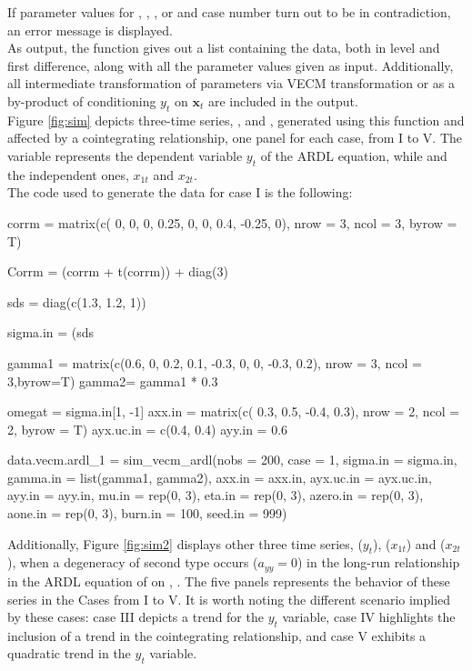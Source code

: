If parameter values for , , , or  and case number turn out to be in contradiction, an error message is displayed.\\
As output, the function gives out a list containing the data, both in level and first difference, along with all the parameter values given as input. Additionally, all intermediate transformation of parameters via VECM transformation or as a by-product of conditioning $y_{t}$ on $\mathbf{x}_{t}$ are included in the output.\\
Figure \ref{fig:sim} depicts  three-time series, ,  and , generated using this function and affected by a cointegrating relationship, one panel for each case, from I to V. The variable  represents the dependent variable $y_t$ of the ARDL equation, while  and  the independent ones, $x_{1t}$ and $x_{2t}$. \\
The code used to generate the data for case I is the following:
\begin{example}
    corrm = matrix(c(   0,     0, 0,
                     0.25,     0, 0,
                      0.4, -0.25, 0), nrow = 3, ncol = 3, byrow = T)

    Corrm = (corrm + t(corrm)) + diag(3)

    sds = diag(c(1.3, 1.2, 1))

    sigma.in = (sds %

    gamma1 = matrix(c(0.6,    0, 0.2,
                      0.1, -0.3,   0,
                        0, -0.3, 0.2), nrow = 3, ncol = 3,byrow=T)
    gamma2= gamma1 * 0.3

    omegat = sigma.in[1, -1] %
    axx.in = matrix(c( 0.3, 0.5,
                      -0.4, 0.3), nrow = 2, ncol = 2, byrow = T)
    ayx.uc.in = c(0.4, 0.4)
    ayy.in = 0.6

    data.vecm.ardl_1 =
    sim_vecm_ardl(nobs = 200,
                  case = 1,
                  sigma.in = sigma.in,
                  gamma.in = list(gamma1, gamma2),
                  axx.in = axx.in,
                  ayx.uc.in = ayx.uc.in,
                  ayy.in = ayy.in,
                  mu.in = rep(0, 3),
                  eta.in = rep(0, 3),
                  azero.in = rep(0, 3),
                  aone.in = rep(0, 3),
                  burn.in = 100,
                  seed.in = 999)
\end{example}
Additionally, Figure \ref{fig:sim2} displays other three time series,  ($y_t$),  ($x_{1t}$) and  ($x_{2t}$), when a degeneracy of second type occurs ($a_{yy} = 0$) in the long-run relationship in the ARDL equation of  on , . The five panels represents the behavior of these series in the Cases from I to V. It is worth noting the different scenario implied by these cases: case III depicts a trend for the $y_t$ variable, case IV highlights the inclusion of a trend in the cointegrating relationship, and case V exhibits a quadratic trend in the $y_t$ variable.\\
